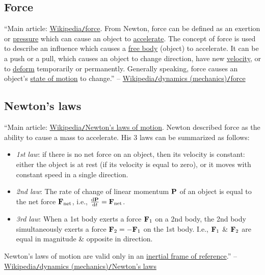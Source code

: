 \documentclass{article}
\begin{document}
\subsection{Force}
``Main article: \href{https://en.wikipedia.org/wiki/Force}{Wikipedia\texttt{/}force}. From Newton, force can be defined as an exertion or \href{https://en.wikipedia.org/wiki/Pressure}{pressure} which can cause an object to \href{https://en.wikipedia.org/wiki/Accelerate}{accelerate}. The concept of force is used to describe an influence which causes a \href{https://en.wikipedia.org/wiki/Free_body}{free body} (object) to accelerate. It can be a push or a pull, which causes an object to change direction, have new \href{https://en.wikipedia.org/wiki/Velocity}{velocity}, or to \href{https://en.wikipedia.org/wiki/Deformation_(mechanics)}{deform} temporarily or permanently. Generally speaking, force causes an object's \href{https://en.wikipedia.org/wiki/Motion_(physics)}{state of motion} to change.'' -- \href{https://en.wikipedia.org/wiki/Dynamics_(mechanics)#Force}{Wikipedia\texttt{/}dynamics (mechanics)\texttt{/}force}

\subsection{Newton's laws}
``Main article: \href{https://en.wikipedia.org/wiki/Newton%27s_laws_of_motion}{Wikipedia\texttt{/}Newton's laws of motion}. Newton described force as the ability to cause a mass to accelerate. His 3 laws can be summarized as follows:
\begin{itemize}
	\item {\it 1st law}: if there is no net force on an object, then its velocity is constant: either the object is at rest (if its velocity is equal to zero), or it moves with constant speed in a single direction.
	\item {\it 2nd law}: The rate of change of linear momentum ${\bf P}$ of an object is equal to the net force ${\bf F}_{\rm net}$, i.e., $\frac{{\rm d}{\bf P}}{{\rm d}t} = {\bf F}_{\rm net}$.
	\item {\it 3rd law}: When a 1st body exerts a force ${\bf F}_1$ on a 2nd body, the 2nd body simultaneously exerts a force ${\bf F}_2 = -{\bf F}_1$ on the 1st body. I.e., ${\bf F}_1$ \& ${\bf F}_2$ are equal in magnitude \& opposite in direction.
\end{itemize}
Newton's laws of motion are valid only in an \href{https://en.wikipedia.org/wiki/Inertial_frame_of_reference}{inertial frame of reference}.'' -- \href{https://en.wikipedia.org/wiki/Dynamics_(mechanics)#Newton's_laws}{Wikipedia\texttt{/}dynamics (mechanics)\texttt{/}Newton's laws}
\end{document}
